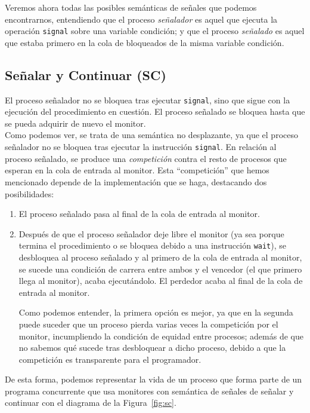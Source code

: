 Veremos ahora todas las posibles semánticas de señales que podemos encontrarnos, entendiendo que el proceso \textit{señalador} es aquel que ejecuta la operación \verb|signal| sobre una variable condición; y que el proceso \textit{señalado} es aquel que estaba primero en la cola de bloqueados de la misma variable condición.

\subsection{Señalar y Continuar (SC)}
El proceso señalador no se bloquea tras ejecutar \verb|signal|, sino que sigue con la ejecución del procedimiento en cuestión. El proceso señalado se bloquea hasta que se pueda adquirir de nuevo el monitor.\\

Como podemos ver, se trata de una semántica no desplazante, ya que el proceso señalador no se bloquea tras ejecutar la instrucción \verb|signal|. En relación al proceso señalado, se produce una \textit{competición} contra el resto de procesos que esperan en la cola de entrada al monitor. Esta ``competición'' que hemos mencionado depende de la implementación que se haga, destacando dos posibilidades:
\begin{enumerate}
    \item El proceso señalado pasa al final de la cola de entrada al monitor.
    \item Después de que el proceso señalador deje libre el monitor (ya sea porque termina el procedimiento o se bloquea debido a una instrucción \verb|wait|), se desbloquea al proceso señalado y al primero de la cola de entrada al monitor, se sucede una condición de carrera entre ambos y el vencedor (el que primero llega al monitor), acaba ejecutándolo. El perdedor acaba al final de la cola de entrada al monitor.

        Como podemos entender, la primera opción es mejor, ya que en la segunda puede suceder que un proceso pierda varias veces la competición por el monitor, incumpliendo la condición de equidad entre procesos; además de que no sabemos qué sucede tras desbloquear a dicho proceso, debido a que la competición es transparente para el programador.
\end{enumerate}
De esta forma, podemos representar la vida de un proceso que forma parte de un programa concurrente que usa monitores con semántica de señales de señalar y continuar con el diagrama de la Figura~\ref{fig:sc}.

